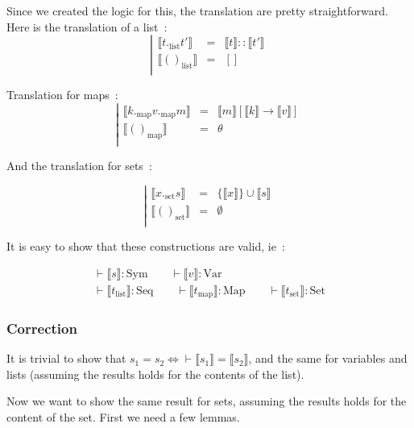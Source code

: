 \documentclass[]{article}
\newcommand{\sem}[1]{\llbracket #1 \rrbracket}
\newcommand{\1}{\mathbbm{1}}
\newcommand{\0}{\mathbbm{0}}
\newcommand{\Sym}{\text{Sym}}
\newcommand{\Var}{\text{Var}}
\newcommand{\Seq}{\text{Seq}}
\newcommand{\Map}{\text{Map}}
\newcommand{\Set}{\text{Set}}
\begin{document}
Since we created the logic for this, the translation are pretty straightforward.
Here is the translation of a list~:
\[\left|\begin{array}{lcl}
    \sem{t._\text{list} t'} & = & \sem{t} :: \sem{t'} \\
    \sem{()_\text{list}}    & = & [] \\
\end{array}\right.\]

Translation for maps~:
\[\left|\begin{array}{lcl}
    \sem{k._\text{map}v._\text{map}m} & = & \sem{m}[\sem{k}\rightarrow\sem{v}] \\
    \sem{()_\text{map}} & = & \theta \\
\end{array}\right.\]

And the translation for sets~:

\[\left|\begin{array}{lcl}
    \sem{x._\text{set} s} & = & \{\sem{x}\}\cup\sem{s} \\
    \sem{()_\text{set}} & = & \emptyset \\
\end{array}\right.\]

It is easy to show that these constructions are valid, ie~:

\[\begin{gathered}
    \vdash \sem{s}:\Sym\qquad\vdash \sem{v}:\Var \\
    \vdash \sem{t_\text{list}}:\Seq
    \qquad\vdash\sem{t_\text{map}}:\Map
    \qquad\vdash\sem{t_\text{set}}:\Set
\end{gathered}\]

\subsubsection{Correction}

It is trivial to show that $s_1 = s_2 \iff \vdash \sem{s_1} = \sem{s_2}$, and
the same for variables and lists (assuming the results holds for the contents of
the list).

Now we want to show the same result for sets, assuming the results holds for the
content of the set. First we need a few lemmas.
\end{document}
